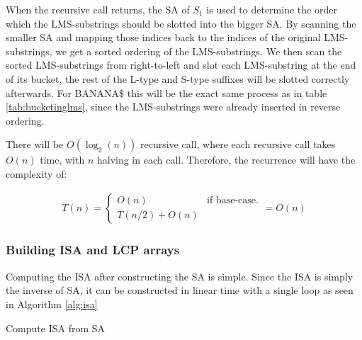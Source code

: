 When the recursive call returns, the SA of $S_1$ is used to determine the order which the
LMS-substrings should be slotted into the bigger SA. By scanning the smaller SA and
mapping those indices back to the indices of the original LMS-substrings, we get a sorted
ordering of the LMS-substrings. We then scan the sorted LMS-substrings from right-to-left
and slot each LMS-substring at the end of its bucket, the rest of the L-type and S-type
suffixes will be slotted correctly afterwards. For BANANA\$ this will be the exact same
process as in table \ref{tab:bucketinglms}, since the LMS-substrings were already inserted
in reverse ordering.


There will be $O(\log_2(n))$ recursive call, where each recursive call takes $O(n)$ time,
with $n$ halving in each call. Therefore, the recurrence will have the complexity of:

\begin{gather*}
    T(n) =
\begin{cases}
    O(n) & \text{if base-case.} \\
    T(n / 2) + O(n)
\end{cases}
= O(n)
\end{gather*}

\subsubsection{Building ISA and LCP arrays}

Computing the ISA after constructing the SA is simple. Since the ISA is simply the inverse
of SA, it can be constructed in linear time with a single loop as seen in Algorithm
\ref{alg:isa}

\begin{algorithm}[htp]
  \SetAlgoLined\DontPrintSemicolon

  \vspace{0.5cm}
  \caption{Compute ISA from SA}
  \label{alg:isa}
\end{algorithm}


